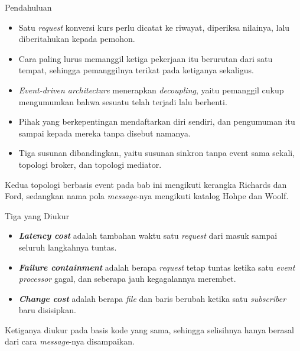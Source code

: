 \documentclass[aspectratio=169, table, 12pt]{beamer}
\begin{document}
\begin{frame}{{\Large Pendahuluan}}
  \vspace{8pt}
  \begin{itemize}\small
    \item Satu \textit{request} konversi kurs perlu dicatat ke riwayat, diperiksa
          nilainya, lalu diberitahukan kepada pemohon.
    \item Cara paling lurus memanggil ketiga pekerjaan itu berurutan dari satu
          tempat, sehingga pemanggilnya terikat pada ketiganya sekaligus.
    \item \textit{Event-driven architecture} menerapkan \textit{decoupling}, yaitu
          pemanggil cukup mengumumkan bahwa sesuatu telah terjadi lalu berhenti.
    \item Pihak yang berkepentingan mendaftarkan diri sendiri, dan pengumuman
          itu sampai kepada mereka tanpa disebut namanya.
    \item Tiga susunan dibandingkan, yaitu susunan sinkron tanpa event sama
          sekali, topologi broker, dan topologi mediator.
  \end{itemize}

  \vspace{8pt}
  {\small Kedua topologi berbasis event pada bab ini mengikuti kerangka Richards
  dan Ford, sedangkan nama pola \textit{message}-nya mengikuti katalog Hohpe dan Woolf.}
\end{frame}

\begin{frame}{{\Large Tiga yang Diukur}}
  \vspace{10pt}
  \begin{itemize}\small
    \item \textbf{\textit{Latency cost}} adalah tambahan waktu satu
          \textit{request} dari masuk sampai seluruh langkahnya tuntas.
    \item \textbf{\textit{Failure containment}} adalah berapa \textit{request}
          tetap tuntas ketika satu \textit{event processor} gagal, dan seberapa
          jauh kegagalannya merembet.
    \item \textbf{\textit{Change cost}} adalah berapa \textit{file} dan baris
          berubah ketika satu \textit{subscriber} baru disisipkan.
  \end{itemize}

  \vspace{10pt}
  {\small Ketiganya diukur pada basis kode yang sama, sehingga selisihnya hanya
  berasal dari cara \textit{message}-nya disampaikan.}
\end{frame}
\end{document}
